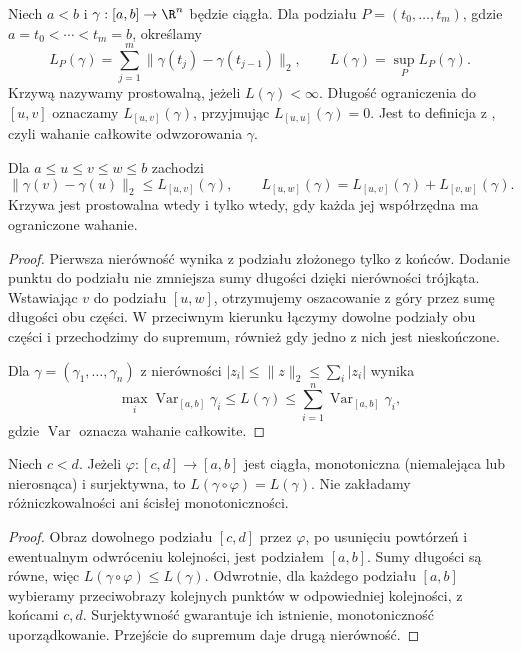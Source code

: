 \begin{definicja}
\label{ma2:def:curve-variation}
Niech $a<b$ i $\gamma:[a,b]\to\R^n$ będzie ciągła.
Dla podziału $P=(t_0,\ldots,t_m)$, gdzie
$a=t_0<\cdots<t_m=b$, określamy
\[
 L_P(\gamma)=\sum_{j=1}^m
 \|\gamma(t_j)-\gamma(t_{j-1})\|_2,\qquad
 L(\gamma)=\sup_P L_P(\gamma).
\]
Krzywą nazywamy prostowalną, jeżeli $L(\gamma)<\infty$.
Długość ograniczenia do $[u,v]$ oznaczamy
$L_{[u,v]}(\gamma)$, przyjmując $L_{[u,u]}(\gamma)=0$.
Jest to definicja z
,
czyli wahanie całkowite odwzorowania $\gamma$.
\end{definicja}

\begin{stwierdzenie}
\label{ma2:prop:curve-length-basic}
Dla $a\le u\le v\le w\le b$ zachodzi
\[
 \|\gamma(v)-\gamma(u)\|_2\le L_{[u,v]}(\gamma),
 \qquad
 L_{[u,w]}(\gamma)=L_{[u,v]}(\gamma)+L_{[v,w]}(\gamma).
\]
Krzywa jest prostowalna wtedy i tylko wtedy,
gdy każda jej współrzędna ma ograniczone wahanie.
\end{stwierdzenie}
\begin{proof}
Pierwsza nierówność wynika z podziału złożonego
tylko z końców. Dodanie punktu do podziału nie
zmniejsza sumy długości dzięki nierówności
trójkąta. Wstawiając $v$ do podziału $[u,w]$,
otrzymujemy oszacowanie z góry przez sumę
długości obu części. W przeciwnym kierunku
łączymy dowolne podziały obu części i przechodzimy
do supremum, również gdy jedno z nich jest nieskończone.

Dla $\gamma=(\gamma_1,\ldots,\gamma_n)$ z nierówności
$|z_i|\le\|z\|_2\le\sum_i|z_i|$ wynika
\[
 \max_i\operatorname{Var}_{[a,b]}\gamma_i
 \le L(\gamma)\le
 \sum_{i=1}^n\operatorname{Var}_{[a,b]}\gamma_i,
\]
gdzie $\operatorname{Var}$ oznacza wahanie całkowite.
\end{proof}

\begin{twierdzenie}
\label{ma2:thm:curve-reparam}
Niech $c<d$. Jeżeli $\varphi:[c,d]\to[a,b]$ jest ciągła,
monotoniczna (niemalejąca lub nierosnąca)
i surjektywna, to $L(\gamma\circ\varphi)=L(\gamma)$.
Nie zakładamy różniczkowalności ani ścisłej monotoniczności.
\end{twierdzenie}
\begin{proof}
Obraz dowolnego podziału $[c,d]$ przez $\varphi$,
po usunięciu powtórzeń i ewentualnym odwróceniu
kolejności, jest podziałem $[a,b]$. Sumy długości
są równe, więc $L(\gamma\circ\varphi)\le L(\gamma)$.
Odwrotnie, dla każdego podziału $[a,b]$ wybieramy
przeciwobrazy kolejnych punktów w odpowiedniej
kolejności, z końcami $c,d$. Surjektywność gwarantuje
ich istnienie, monotoniczność uporządkowanie.
Przejście do supremum daje drugą nierówność.
\end{proof}

